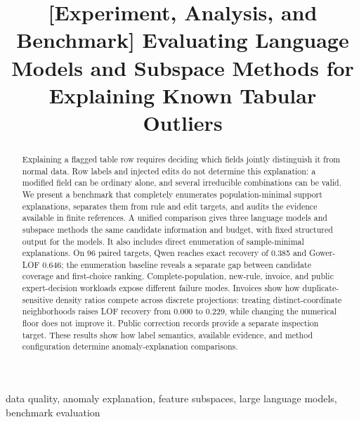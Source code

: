 \documentclass[conference]{IEEEtran}
\begin{document}
\title{[Experiment, Analysis, and Benchmark] Evaluating Language Models and Subspace Methods for Explaining Known Tabular Outliers}

\author{
}

\maketitle

\begin{abstract}
Explaining a flagged table row requires deciding which fields jointly distinguish it from normal data. Row labels and injected edits do not determine this explanation: a modified field can be ordinary alone, and several irreducible combinations can be valid. We present a benchmark that completely enumerates population-minimal support explanations, separates them from rule and edit targets, and audits the evidence available in finite references. A unified comparison gives three language models and subspace methods the same candidate information and budget, with fixed structured output for the models. It also includes direct enumeration of sample-minimal explanations. On 96 paired targets, Qwen reaches exact recovery of 0.385 and Gower-LOF 0.646; the enumeration baseline reveals a separate gap between candidate coverage and first-choice ranking. Complete-population, new-rule, invoice, and public expert-decision workloads expose different failure modes. Invoices show how duplicate-sensitive density ratios compete across discrete projections: treating distinct-coordinate neighborhoods raises LOF recovery from 0.000 to 0.229, while changing the numerical floor does not improve it. Public correction records provide a separate inspection target. These results show how label semantics, available evidence, and method configuration determine anomaly-explanation comparisons.
\end{abstract}
\begin{IEEEkeywords}
data quality, anomaly explanation, feature subspaces, large language models, benchmark evaluation
\end{IEEEkeywords}
\end{document}
